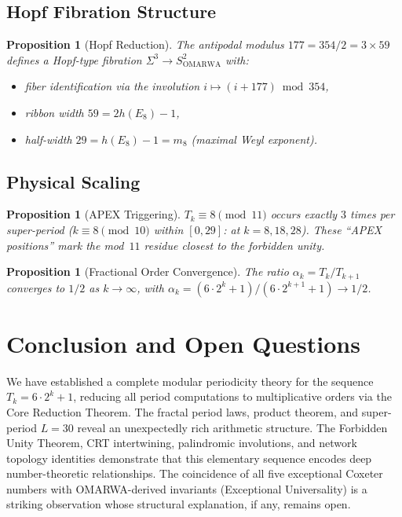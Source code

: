 \documentclass[11pt, a4paper]{article}
\theoremstyle{plain}
\newtheorem{proposition}[theorem]{Proposition}
\theoremstyle{definition}
\theoremstyle{remark}
\begin{document}
\subsection{Hopf Fibration Structure}

\begin{proposition}[Hopf Reduction]\label{prop:hopf}
The antipodal modulus $177 = 354/2 = 3 \times 59$ defines a Hopf-type
fibration $\Sigma^3 \to S^2_{\mathrm{OMARWA}}$ with:
\begin{itemize}
  \item fiber identification via the involution
    $i \mapsto (i + 177) \bmod 354$,
  \item ribbon width $59 = 2h(E_8) - 1$,
  \item half-width $29 = h(E_8) - 1 = m_8$ (maximal Weyl exponent).
\end{itemize}
\end{proposition}

\subsection{Physical Scaling}

\begin{proposition}[APEX Triggering]\label{prop:apex}
$T_k \equiv 8 \pmod{11}$ occurs exactly $3$ times per super-period
($k \equiv 8 \pmod{10}$ within $[0, 29]$: at $k = 8, 18, 28$).
These ``APEX positions'' mark the mod~$11$ residue closest to the
forbidden unity.
\end{proposition}

\begin{proposition}[Fractional Order Convergence]\label{prop:alpha}
The ratio $\alpha_k = T_k / T_{k+1}$ converges to $1/2$ as
$k \to \infty$, with
$\alpha_k = (6 \cdot 2^k + 1) / (6 \cdot 2^{k+1} + 1) \to 1/2$.
\end{proposition}

\section{Conclusion and Open Questions}

We have established a complete modular periodicity theory for the
sequence $T_k = 6 \cdot 2^k + 1$, reducing all period computations to
multiplicative orders via the Core Reduction Theorem. The fractal period
laws, product theorem, and super-period $L = 30$ reveal an unexpectedly
rich arithmetic structure. The Forbidden Unity Theorem, CRT
intertwining, palindromic involutions, and network topology identities
demonstrate that this elementary sequence encodes deep number-theoretic
relationships. The coincidence of all five exceptional Coxeter numbers
with OMARWA-derived invariants (Exceptional Universality) is a striking
observation whose structural explanation, if any, remains open.
\end{document}
